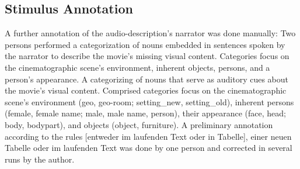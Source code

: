 \documentclass[english]{article}
\begin{document}
\subsection{Stimulus Annotation}
A further annotation of the audio-description's narrator was done manually: Two
persons performed a categorization of nouns embedded in sentences spoken by the
narrator to describe the movie's missing visual content.
Categories focus on the cinematographic scene's environment, inherent objects, persons, and a person's appearance.
A categorizing of nouns that serve as auditory cues about the movie's visual content. Comprised categories focus on the cinematographic scene's environment (geo, geo-room; setting\_new, setting\_old), inherent persons (female, female name; male, male name, person), their appearance (face, head; body, bodypart), and objects (object, furniture).
A preliminary annotation according to the rules [entweder im laufenden Text oder in Tabelle], einer neuen Tabelle oder im laufenden Text was done by one person and corrected in several runs by the author.
\end{document}
